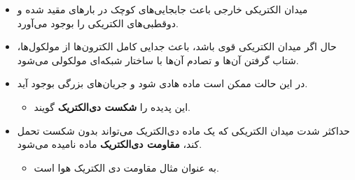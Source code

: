 \begin{ELexample}{}
\begin{ELsolution}

\end{ELsolution}

\end{ELexample}

\ELhold


\begin{ELunit}

\begin{itemize}
\tightlist
\item
  میدان الکتریکی خارجی باعث جابجایی‌های کوچک در بارهای مقید شده و دوقطبی‌های الکتریکی را بوجود می‌آورد.
\item
  حال اگر میدان الکتریکی قوی باشد، باعث جدایی کامل الکترون‌ها از مولکول‌ها، شتاب گرفتن آن‌ها و تصادم آن‌ها با ساختار شبکه‌ای مولکولی می‌شود.
\item
  در این حالت ممکن است ماده هادی شود و جریان‌های بزرگی بوجود آید.

  \begin{itemize}
  \tightlist
  \item
    این پدیده را \textbf{شکست دی‌الکتریک} گویند.
  \end{itemize}
\item
  حداکثر شدت میدان الکتریکی که یک ماده دی‌الکتریک می‌تواند بدون شکست تحمل کند، \textbf{مقاومت دی‌الکتریک} ماده نامیده می‌شود.

  \begin{itemize}
  \tightlist
  \item
    به عنوان مثال مقاومت دی الکتریک هوا  است.
  \end{itemize}
\end{itemize}

\end{ELunit}

